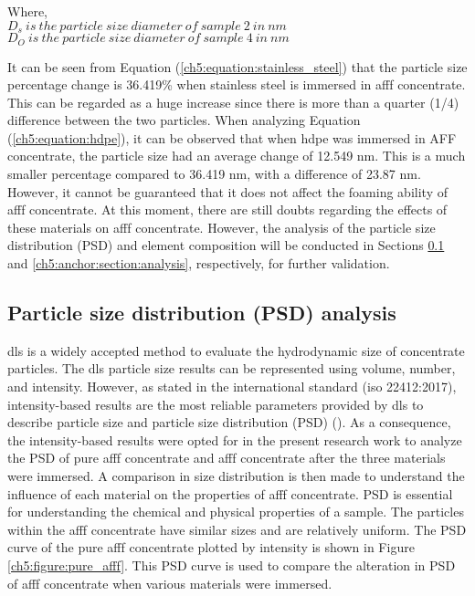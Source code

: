 \begin{doublespace}
Where, \\
$D_s\ is\ the\ particle\ size\ diameter\ of\ sample\ 2\ in\ nm$ \\
$D_O\ is\ the\ particle\ size\ diameter\ of\ sample\ 4\ in\ nm$ \\
\end{doublespace}

It can be seen from Equation (\ref{ch5:equation:stainless_steel}) that the particle size percentage change is 36.419\% when stainless steel is immersed in \acrshort{afff} concentrate. This can be regarded as a huge increase since there is more than a quarter (1/4) difference between the two particles. When analyzing Equation (\ref{ch5:equation:hdpe}), it can be observed that when \acrshort{hdpe} was immersed in AFF concentrate, the particle size had an average change of 12.549 nm. This is a much smaller percentage compared to 36.419 nm, with a difference of 23.87 nm. However, it cannot be guaranteed that it does not affect the foaming ability of \acrshort{afff} concentrate. At this moment, there are still doubts regarding the effects of these materials on \acrshort{afff} concentrate. However, the analysis of the particle size distribution (PSD) and element composition will be conducted in Sections \ref{ch5:anchor:section:psd} and \ref{ch5:anchor:section:analysis}, respectively, for further validation.

\subsection{Particle size distribution (PSD) analysis}
\label{ch5:anchor:section:psd}
\acrshort{dls} is a widely accepted method to evaluate the hydrodynamic size of concentrate particles. The \acrshort{dls} particle size results can be represented using volume, number, and intensity. However, as stated in the international standard (\acrshort{iso} 22412:2017), intensity-based results are the most reliable parameters provided by \acrshort{dls} to describe particle size and particle size distribution (PSD) (\cite{ramirez2021characterization}). As a consequence, the intensity-based results were opted for in the present research work to analyze the PSD of pure \acrshort{afff} concentrate and \acrshort{afff} concentrate after the three materials were immersed. A comparison in size distribution is then made to understand the influence of each material on the properties of \acrshort{afff} concentrate. PSD is essential for understanding the chemical and physical properties of a sample. The particles within the \acrshort{afff} concentrate have similar sizes and are relatively uniform. The PSD curve of the pure \acrshort{afff} concentrate plotted by intensity is shown in Figure \ref{ch5:figure:pure_afff}. This PSD curve is used to compare the alteration in PSD of \acrshort{afff} concentrate when various materials were immersed.

